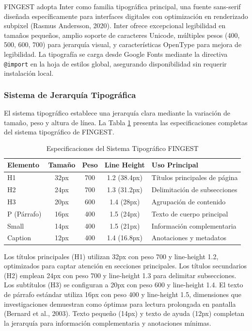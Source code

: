 \documentclass[12pt,a4paper,oneside]{article}
\begin{document}
FINGEST adopta Inter como familia tipográfica principal, una fuente sans-serif diseñada específicamente para interfaces digitales con optimización en renderizado subpixel (Rasmus Andersson, 2020). Inter ofrece excepcional legibilidad en tamaños pequeños, amplio soporte de caracteres Unicode, múltiples pesos (400, 500, 600, 700) para jerarquía visual, y características OpenType para mejora de legibilidad. La tipografía se carga desde Google Fonts mediante la directiva \texttt{@import} en la hoja de estilos global, asegurando disponibilidad sin requerir instalación local.

\subsubsection{Sistema de Jerarquía Tipográfica}

El sistema tipográfico establece una jerarquía clara mediante la variación de tamaño, peso y altura de línea. La Tabla \ref{tab:tipografia} presenta las especificaciones completas del sistema tipográfico de FINGEST.

\begin{table}[h]
\centering
\caption{Especificaciones del Sistema Tipográfico FINGEST}
\label{tab:tipografia}
\begin{tabular}{|l|c|c|c|p{4cm}|}
\hline
\textbf{Elemento} & \textbf{Tamaño} & \textbf{Peso} & \textbf{Line Height} & \textbf{Uso Principal} \\
\hline
H1 & 32px & 700 & 1.2 (38.4px) & Títulos principales de página \\
\hline
H2 & 24px & 700 & 1.3 (31.2px) & Delimitación de subsecciones \\
\hline
H3 & 20px & 600 & 1.4 (28px) & Agrupación de contenido \\
\hline
P (Párrafo) & 16px & 400 & 1.5 (24px) & Texto de cuerpo principal \\
\hline
Small & 14px & 400 & 1.5 (21px) & Información complementaria \\
\hline
Caption & 12px & 400 & 1.4 (16.8px) & Anotaciones y metadatos \\
\hline
\end{tabular}
\end{table}

Los títulos principales (H1) utilizan 32px con peso 700 y line-height 1.2, optimizados para captar atención en secciones principales. Los títulos secundarios (H2) emplean 24px con peso 700 y line-height 1.3 para delimitar subsecciones. Los subtítulos (H3) se configuran a 20px con peso 600 y line-height 1.4. El texto de párrafo estándar utiliza 16px con peso 400 y line-height 1.5, dimensiones que investigaciones demuestran como óptimas para lectura prolongada en pantalla (Bernard et al., 2003). Texto pequeño (14px) y texto de ayuda (12px) completan la jerarquía para información complementaria y anotaciones mínimas.
\end{document}
